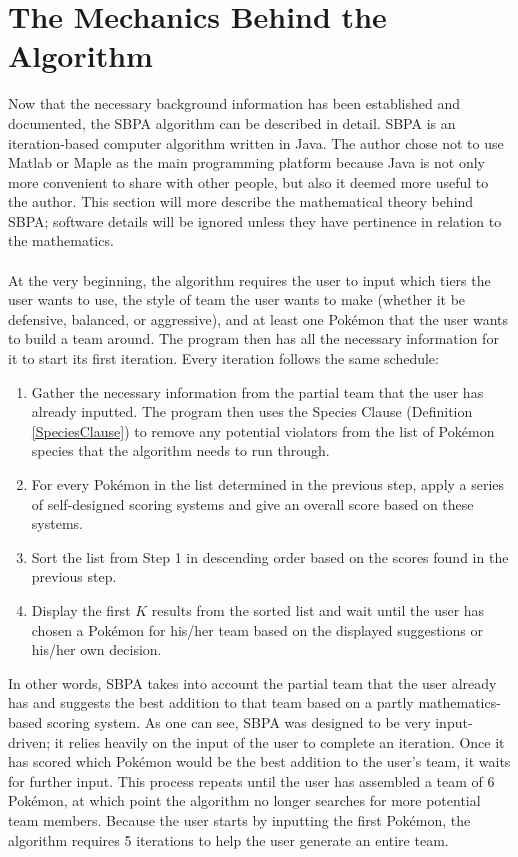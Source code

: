 \documentclass{article}
\begin{document}
\section{The Mechanics Behind the Algorithm}
Now that the necessary background information has been established and documented, the SBPA algorithm can be described in detail. SBPA is an iteration-based computer algorithm written in Java. The author chose not to use Matlab or Maple as the main programming platform because Java is not only more convenient to share with other people, but also it deemed more useful to the author. This section will more describe the mathematical theory behind SBPA; software details will be ignored unless they have pertinence in relation to the mathematics.\\\\
At the very beginning, the algorithm requires the user to input which tiers the user wants to use, the style of team the user wants to make (whether it be defensive, balanced, or aggressive), and at least one Pok\'emon that the user wants to build a team around. The program then has all the necessary information for it to start its first iteration. Every iteration  follows the same schedule:
\begin{enumerate}
	\item Gather the necessary information from the partial team that the user has already inputted. The program then uses the Species Clause (Definition \ref{SpeciesClause}) to remove any potential violators from the list of Pok\'emon species that the algorithm needs to run through.
	\item For every Pok\'emon in the list determined in the previous step, apply a series of self-designed scoring systems and give an overall score based on these systems.
	\item Sort the list from Step 1 in descending order based on the scores found in the previous step.
	\item Display the first $K$ results from the sorted list and wait until the user has chosen a Pok\'emon for his/her team based on the displayed suggestions or his/her own decision.
\end{enumerate}
In other words, SBPA takes into account the partial team that the user already has and suggests the best addition to that team based on a partly mathematics-based scoring system. As one can see, SBPA was designed to be very input-driven; it relies heavily on the input of the user to complete an iteration. Once it has scored which Pok\'emon would be the best addition to the user's team, it waits for further input. This process repeats until the user has assembled a team of 6 Pok\'emon, at which point the algorithm no longer searches for more potential team members. Because the user starts by inputting the first Pok\'emon, the algorithm requires 5 iterations to help the user generate an entire team.\\\\
\end{document}
